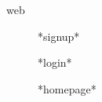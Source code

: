 \documentclass[english]{article}
\begin{document}

web
\begin{figure}
	\centering
	\caption{*signup*}
\end{figure}
\begin{figure}
	\centering
	\caption{*login*}
\end{figure}
\begin{figure}
	\centering
	\caption{*homepage*}
\end{figure}
	
\end{document}
